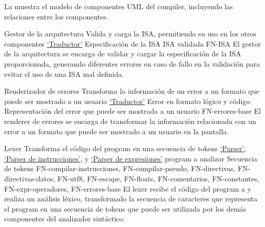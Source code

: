 La  muestra el modelo de componentes UML
\parencite{UMLSpec} del \gls{compiler}, incluyendo las relaciones entre los
componentes.


\printcomptemplate

\newcommand{\componentref}[1]{\hyperref[req:#1]{`#1'}}

\begin{component}{Gestor de la arquitectura}
    {Valida y carga la \gls{ISA}, permitiendo su uso en los otros componentes} %
    {\componentref{Traductor}} %
    {Especificación de la \gls{ISA}} %
    {\gls{ISA} validada} %
    {FN-ISA} %
    El gestor de la arquitectura se encarga de validar y cargar la
    especificación de la \gls{ISA} proporcionada, generando diferentes errores
    en caso de fallo en la validación para evitar el uso de una \gls{ISA} mal
    definida.
\end{component}

\begin{component}{Renderizador de errores}
    {Transforma la información de un error a un formato que puede ser mostrado a un usuario} %
    {\componentref{Traductor}} %
    {Error en formato lógico y código } %
    {Representación del error que puede ser mostrada a un usuario} %
    {FN-errores-base} %
    El \gls{renderer} de errores se encarga de transformar la información
    relacionada con un error a un formato que puede ser mostrado a un usuario en
    la pantalla.
\end{component}

\begin{component}{Lexer}
    {Transforma el código del \gls{program} en una secuencia de \glspl{token}} %
    {\componentref{Parser}, \componentref{Parser de instrucciones}, y \componentref{Parser de expresiones}} %
    {\Gls{program} a analizar} %
    {Secuencia de \glspl{token}} %
    {FN-compilar-instrucciones, FN-compilar-pseudo, FN-directivas, FN-directivas-datos, FN-utf8, FN-escape, FN-floats, FN-comentarios, FN-constantes, FN-expr-operadores, FN-errores-base} %
    El lexer recibe el código del \gls{program} a
     y realiza un análisis léxico, transformado
    la secuencia de caracteres que representa el \gls{program} en una secuencia
    de \glspl{token} que puede ser utilizada por los demás componentes del
    analizador sintáctico.
\end{component}

